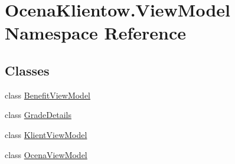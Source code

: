 \hypertarget{namespace_ocena_klientow_1_1_view_model}{}\section{Ocena\+Klientow.\+View\+Model Namespace Reference}
\label{namespace_ocena_klientow_1_1_view_model}
\subsection*{Classes}
\begin{DoxyCompactItemize}
\item 
class \hyperlink{class_ocena_klientow_1_1_view_model_1_1_benefit_view_model}{Benefit\+View\+Model}
\item 
class \hyperlink{class_ocena_klientow_1_1_view_model_1_1_grade_details}{Grade\+Details}
\item 
class \hyperlink{class_ocena_klientow_1_1_view_model_1_1_klient_view_model}{Klient\+View\+Model}
\item 
class \hyperlink{class_ocena_klientow_1_1_view_model_1_1_ocena_view_model}{Ocena\+View\+Model}
\end{DoxyCompactItemize}
